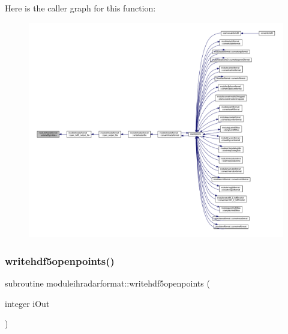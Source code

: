 Here is the caller graph for this function\+:\nopagebreak
\begin{figure}[H]
\begin{center}
\leavevmode
\includegraphics[width=350pt]{namespacemoduleihradarformat_aded21feba733b9d42beced7d5846c854_icgraph}
\end{center}
\end{figure}
\mbox{\label{namespacemoduleihradarformat_a2599e1f0971dcb3531d9ee88d55830d8}} 
\subsubsection{\texorpdfstring{writehdf5openpoints()}{writehdf5openpoints()}}
{\footnotesize\ttfamily subroutine moduleihradarformat\+::writehdf5openpoints (\begin{DoxyParamCaption}\item[{integer}]{i\+Out }\end{DoxyParamCaption})\hspace{0.3cm}{\ttfamily [private]}}

